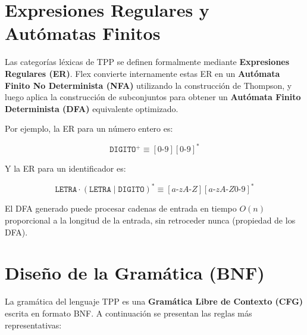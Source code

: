 \section{Expresiones Regulares y Autómatas Finitos}

Las categorías léxicas de TPP se definen formalmente mediante \textbf{Expresiones Regulares (ER)}. Flex convierte internamente estas ER en un \textbf{Autómata Finito No Determinista (NFA)} utilizando la construcción de Thompson, y luego aplica la construcción de subconjuntos para obtener un \textbf{Autómata Finito Determinista (DFA)} equivalente optimizado.

Por ejemplo, la ER para un número entero es:

\[
\texttt{DIGITO}^{+} \equiv [0\text{-}9][0\text{-}9]^{*}
\]

Y la ER para un identificador es:

\[
\texttt{LETRA} \cdot (\texttt{LETRA} \mid \texttt{DIGITO})^{*} \equiv [a\text{-}zA\text{-}Z][a\text{-}zA\text{-}Z0\text{-}9]^{*}
\]

El DFA generado puede procesar cadenas de entrada en tiempo $O(n)$ proporcional a la longitud de la entrada, sin retroceder nunca (propiedad de los DFA).

\section{Diseño de la Gramática (BNF)}

La gramática del lenguaje TPP es una \textbf{Gramática Libre de Contexto (CFG)} escrita en formato BNF. A continuación se presentan las reglas más representativas:

